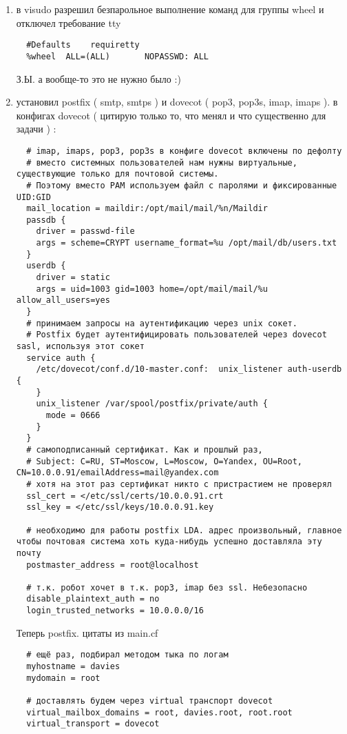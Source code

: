 \documentclass[a4paper,10pt]{report}
\begin{document}
\begin{enumerate}
  \item в visudo разрешил безпарольное выполнение команд для группы wheel и отключел требование tty
  \begin{verbatim}
  #Defaults    requiretty
  %wheel  ALL=(ALL)       NOPASSWD: ALL
  \end{verbatim}
  З.Ы. а вообще-то это не нужно было :)
  \item установил postfix ( smtp, smtps ) и dovecot ( pop3, pop3s, imap, imaps ). в конфигах dovecot ( цитирую только то, что менял и что существенно для задачи ) :
  \begin{verbatim}
  # imap, imaps, pop3, pop3s в конфиге dovecot включены по дефолту
  # вместо системных пользователей нам нужны виртуальные, существующие только для почтовой системы.
  # Поэтому вместо PAM используем файл с паролями и фиксированные UID:GID
  mail_location = maildir:/opt/mail/mail/%n/Maildir
  passdb {
    driver = passwd-file
    args = scheme=CRYPT username_format=%u /opt/mail/db/users.txt
  }
  userdb {
    driver = static
    args = uid=1003 gid=1003 home=/opt/mail/mail/%u allow_all_users=yes
  }
  # принимаем запросы на аутентификацию через unix сокет.
  # Postfix будет аутентифицировать пользователей через dovecot sasl, используя этот сокет
  service auth {
    /etc/dovecot/conf.d/10-master.conf:  unix_listener auth-userdb {
    }
    unix_listener /var/spool/postfix/private/auth {
      mode = 0666
    }
  }
  # самоподписанный сертификат. Как и прошлый раз, 
  # Subject: C=RU, ST=Moscow, L=Moscow, O=Yandex, OU=Root, CN=10.0.0.91/emailAddress=mail@yandex.com
  # хотя на этот раз сертификат никто с пристрастием не проверял
  ssl_cert = </etc/ssl/certs/10.0.0.91.crt
  ssl_key = </etc/ssl/keys/10.0.0.91.key

  # необходимо для работы postfix LDA. адрес произвольный, главное чтобы почтовая система хоть куда-нибудь успешно доставляла эту почту
  postmaster_address = root@localhost

  # т.к. робот хочет в т.к. pop3, imap без ssl. Небезопасно
  disable_plaintext_auth = no
  login_trusted_networks = 10.0.0.0/16
  \end{verbatim}
  Теперь postfix.  цитаты из main.cf
  \begin{verbatim}
  # ещё раз, подбирал методом тыка по логам
  myhostname = davies
  mydomain = root

  # доставлять будем через virtual транспорт dovecot
  virtual_mailbox_domains = root, davies.root, root.root
  virtual_transport = dovecot


\end{verbatim}
\end{enumerate}
\end{document}
